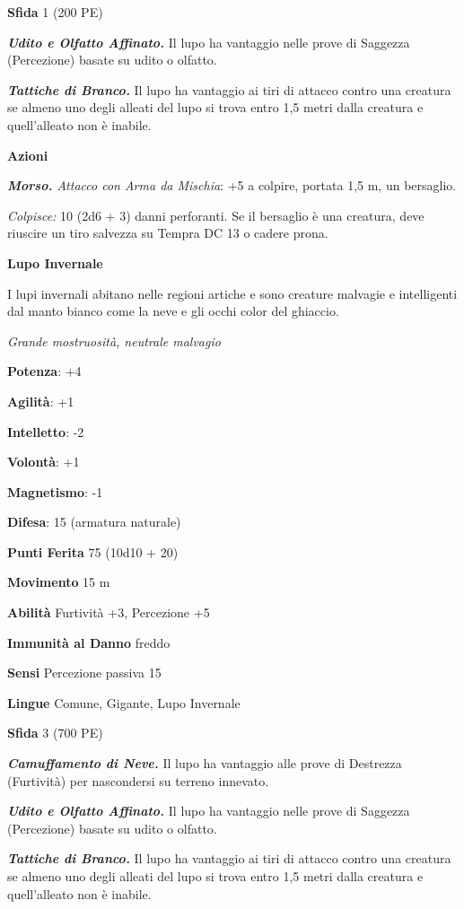 \begin{multicols}{2}
\textbf{Sfida} 1 (200 PE)

\emph{\textbf{Udito e Olfatto Affinato.}} Il lupo ha vantaggio nelle
prove di Saggezza (Percezione) basate su udito o olfatto.

\emph{\textbf{Tattiche di Branco.}} Il lupo ha vantaggio ai tiri di
attacco contro una creatura se almeno uno degli alleati del lupo si
trova entro 1,5 metri dalla creatura e quell'alleato non è inabile.

\textbf{Azioni}

\emph{\textbf{Morso.} Attacco con Arma da Mischia}: +5 a colpire,
portata 1,5 m, un bersaglio.

\emph{Colpisce:} 10 (2d6 + 3) danni perforanti. Se il bersaglio è una
creatura, deve riuscire un tiro salvezza su Tempra DC 13 o cadere prona.

\textbf{Lupo Invernale}

I lupi invernali abitano nelle regioni artiche e sono creature malvagie
e intelligenti dal manto bianco come la neve e gli occhi color del
ghiaccio.

\emph{Grande mostruosità, neutrale malvagio}

\textbf{Potenza}: +4

\textbf{Agilità}: +1

\textbf{Intelletto}: -2

\textbf{Volontà}: +1

\textbf{Magnetismo}: -1

\textbf{Difesa}: 15 (armatura naturale)

\textbf{Punti Ferita} 75 (10d10 + 20)

\textbf{Movimento} 15 m

\textbf{Abilità} Furtività +3, Percezione +5

\textbf{Immunità al Danno} freddo

\textbf{Sensi} Percezione passiva 15

\textbf{Lingue} Comune, Gigante, Lupo Invernale

\textbf{Sfida} 3 (700 PE)

\emph{\textbf{Camuffamento di Neve.}} Il lupo ha vantaggio alle prove di
Destrezza (Furtività) per nascondersi su terreno innevato.

\emph{\textbf{Udito e Olfatto Affinato.}} Il lupo ha vantaggio nelle
prove di Saggezza (Percezione) basate su udito o olfatto.

\emph{\textbf{Tattiche di Branco.}} Il lupo ha vantaggio ai tiri di
attacco contro una creatura se almeno uno degli alleati del lupo si
trova entro 1,5 metri dalla creatura e quell'alleato non è inabile.


\end{multicols}
